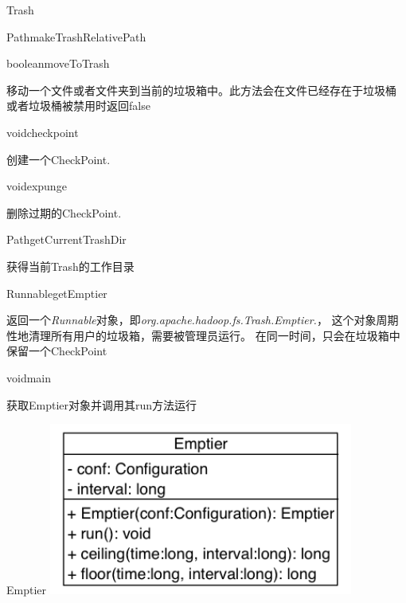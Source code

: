 \begin{XeClass}{Trash}
\begin{XeMethod}{\XePrivate}{Path}{makeTrashRelativePath}
    \end{XeMethod}

    \begin{XeMethod}{\XePublic}{boolean}{moveToTrash}
         
 移动一个文件或者文件夹到当前的垃圾箱中。此方法会在文件已经存在于垃圾桶
 或者垃圾桶被禁用时返回false

    \end{XeMethod}

    \begin{XeMethod}{\XePublic}{void}{checkpoint}
         
 创建一个CheckPoint.

    \end{XeMethod}

    \begin{XeMethod}{\XePublic}{void}{expunge}
         
 删除过期的CheckPoint.

    \end{XeMethod}

    \begin{XeMethod}{}{Path}{getCurrentTrashDir}
         
 获得当前Trash的工作目录

    \end{XeMethod}

    \begin{XeMethod}{\XePublic}{Runnable}{getEmptier}
         
 返回一个\emph{Runnable}对象，即\emph{org.apache.hadoop.fs.Trash.Emptier.}，
 这个对象周期性地清理所有用户的垃圾箱，需要被管理员运行。
 在同一时间，只会在垃圾箱中保留一个CheckPoint

    \end{XeMethod}

    \begin{XeMethod}{\XePublic}{void}{main}
         
 获取Emptier对象并调用其run方法运行

    \end{XeMethod}

    \begin{XeInnerClass}{Emptier}
\includegraphics[width=10cm]{cdig/Emptier.png}
         

\end{XeInnerClass}
\end{XeClass}
